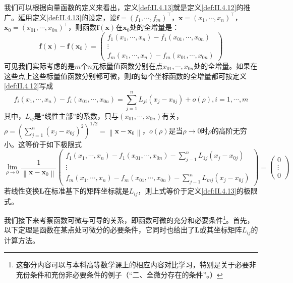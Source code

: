 \documentclass[main.tex]{subfiles}
\begin{document}
我们可以根据向量函数的定义来看出，定义\ref{def:II.4.13}就是定义\ref{def:II.4.12}的推广。延用定义\ref{def:II.4.13}的设定，设$\mathbf{f}=\left(f_1,\cdots,f_m\right)^\intercal$，$\mathbf{x}=\left(x_1,\cdots,x_n\right)^\intercal$，$\mathbf{x}_0=\left(x_{01},\cdots,x_{0n}\right)^\intercal$，则函数$\mathbf{f}\left(\mathbf{x}\right)$在$\mathbf{x}_0$处的全增量是：
\[
    \mathbf{f}\left(\mathbf{x}\right)-\mathbf{f}\left(\mathbf{x}_0\right)=\left(
    \begin{array}{c}
            f_1\left(x_1,\cdots,x_n\right)-f_1\left(x_{01},\cdots,x_{0n}\right) \\
            \vdots                                                              \\
            f_m\left(x_1,\cdots,x_n\right)-f_m\left(x_{01},\cdots,x_{0n}\right)
        \end{array}\right)
\]
可见我们实际考虑的是$m$个$n$元标量值函数分别在点$x_{01},\cdots,x_{0n}$处的全增量。如果在这些点上这些标量值函数分别都可微，则$\mathbf{f}$的每个坐标函数的全增量都可按定义\ref{def:II.4.12}写成
\[
    f_i\left(x_1,\cdots,x_n\right)-f_i\left(x_{01},\cdots,x_{0n}\right)=\sum_{j=1}^n L_{ji}\left(x_j-x_{0j}\right)+o\left(\rho\right),i=1,\cdots,m
\]
其中，$L_{ij}$是“线性主部”的系数，只与$\left(x_{01},\cdots,x_{0n}\right)$有关，$\rho=\left(\sum_{j=1}^n\left(x_j-x_{0j}\right)^2\right)^{1/2}=\left\|\mathbf{x}-\mathbf{x}_0\right\|$，$o\left(\rho\right)$是当$\rho\to 0$时$\rho$的高阶无穷小。这等价于如下极限式
\[
    \lim_{\rho\to 0}\frac{1}{\left\|\mathbf{x}-\mathbf{x}_0\right\|}\left(\begin{array}{c}
            f_1\left(x_1,\cdots,x_n\right)-f_1\left(x_{01},\cdots,x_{0n}\right)-\sum_{j-1}^nL_{1j}\left(x_j-x_{0j}\right) \\
            \vdots                                                                                                        \\
            f_m\left(x_1,\cdots,x_n\right)-f_m\left(x_{01},\cdots,x_{0n}\right)-\sum_{j-1}^nL_{mj}\left(x_j-x_{0j}\right)
        \end{array}\right)=\left(\begin{array}{c}0\\\vdots\\0\end{array}\right)
\]
若线性变换$\mathbf{L}$在标准基下的矩阵坐标就是$L_{ij}$，则上式等价于定义\ref{def:II.4.13}的极限式。

我们接下来考察函数可微与可导的关系，即函数可微的充分和必要条件\footnote{这部分内容可以与本科高等数学课上的相应内容对比学习，特别是关于必要非充份条件和充份非必要条件的例子（“二、全微分存在的条件”\cite[p.~20]{华工高数2009下}。）}。首先，以下定理是函数在某点处可微分的必要条件，它同时也给出了$\mathbf{L}$或其坐标矩阵$L_{ij}$的计算方法。
\end{document}

